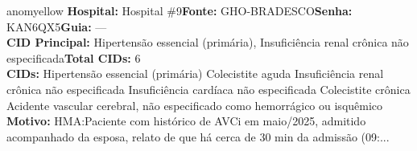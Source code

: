 \documentclass[a4paper,10pt]{article}
\begin{document}
\begin{anomalycard}[Interna\c{c}\~{a}o \#120826 | Pac. \#59852 | MODERADO (z=2.27) | LOS: 3d | 08/03/2026\,$\to$\,11/03/2026]{anomyellow}
\textbf{Hospital:} Hospital \#9\quad \textbf{Fonte:} GHO-BRADESCO\quad \textbf{Senha:} KAN6QX5\quad \textbf{Guia:} ---\\

\textbf{CID Principal:} {\small Hipertensão essencial (primária), Insuficiência renal crônica não especificada}\quad\textbf{Total CIDs:} 6\\

\textbf{CIDs:} {\scriptsize Hipertensão essencial (primária) \textbar{} Colecistite aguda \textbar{} Insuficiência renal crônica não especificada \textbar{} Insuficiência cardíaca não especificada \textbar{} Colecistite crônica \textbar{} Acidente vascular cerebral, não especificado como hemorrágico ou isquêmico}\\

\textbf{Motivo:} {\scriptsize HMA:Paciente com histórico de AVCi em maio/2025, admitido acompanhado da esposa, relato de que há cerca de 30 min da admissão (09:...}\\



\end{anomalycard}
\end{document}
